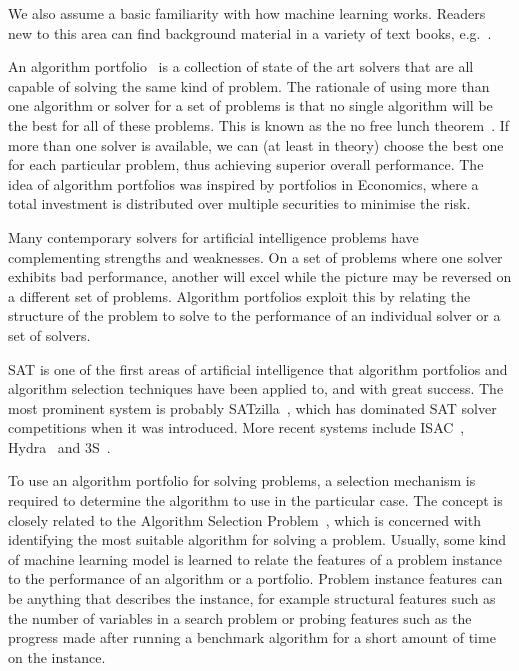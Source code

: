 \documentclass{article}\usepackage[]{graphicx}\usepackage[]{color}
\begin{document}
We also assume a basic familiarity with how machine learning works. Readers new
to this area can find background material in a variety of text books, e.g.\
\cite{pattern_bishop_2007,witten_data_2011,machine_lantz_2013}.

An algorithm portfolio~\cite{huberman_economics_1997,gomes_algorithm_2001} is a
collection of state of the art solvers that are all capable of solving the same
kind of problem. The rationale of using more than one algorithm or solver for a
set of problems is that no single algorithm will be the best for all of these
problems. This is known as the no free lunch theorem~\cite{wolpert_no_1997}. If
more than one solver is available, we can (at least in theory) choose the best
one for each particular problem, thus achieving superior overall performance.
The idea of algorithm portfolios was inspired by portfolios in Economics, where
a total investment is distributed over multiple securities to minimise the risk.

Many contemporary solvers for artificial intelligence problems have
complementing strengths and weaknesses. On a set of problems where one solver
exhibits bad performance, another will excel while the picture may be reversed
on a different set of problems. Algorithm portfolios exploit this by relating
the structure of the problem to solve to the performance of an individual solver
or a set of solvers.

SAT is one of the first areas of artificial intelligence that algorithm
portfolios and algorithm selection techniques have been applied to, and with
great success. The most prominent system is probably
SATzilla~\cite{xu_satzilla_2008}, which has dominated SAT solver competitions
when it was introduced. More recent systems include
ISAC~\cite{kadioglu_isac_2010}, Hydra~\cite{xu_hydra_2010} and
3S~\cite{kadioglu_algorithm_2011}.

To use an algorithm portfolio for solving problems, a selection mechanism is
required to determine the algorithm to use in the particular case. The concept
is closely related to the Algorithm Selection
Problem~\cite{rice_algorithm_1976}, which is concerned with identifying the most
suitable algorithm for solving a problem. Usually, some kind of machine learning
model is learned to relate the features of a problem instance to the performance
of an algorithm or a portfolio. Problem instance features can be anything that
describes the instance, for example structural features such as the number of
variables in a search problem or probing features such as the progress made
after running a benchmark algorithm for a short amount of time on the instance.
\end{document}
